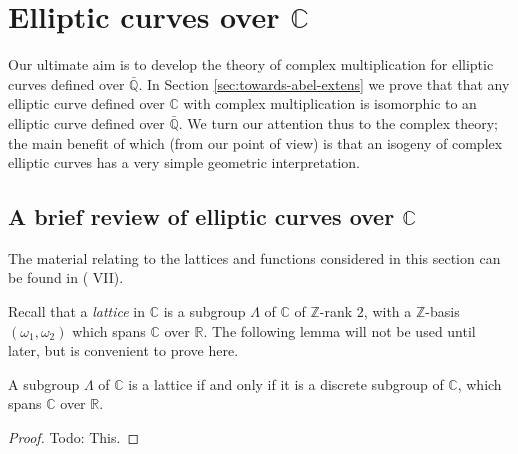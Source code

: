\newpage
\section{Elliptic curves over $\mathbb{C}$}
\label{sec:compl-mult-over-C}

Our ultimate aim is to develop the theory of complex multiplication for elliptic
curves defined over $\mathbb{\bar{Q}}$.  In Section \ref{sec:towards-abel-extens} we
prove that that any elliptic curve defined over $\mathbb{C}$ with complex
multiplication is isomorphic to an elliptic curve defined over $\mathbb{\bar{Q}}$.
We turn our attention thus to the complex theory; the main benefit of which (from our
point of view) is that an isogeny of complex elliptic curves has a very simple
geometric interpretation.

\subsection{A brief review of elliptic curves over $\mathbb{C}$}
\label{sec:review-complex-curves}



The material relating to the lattices and functions considered in this section can be
found in (\cite{serre73} VII).

Recall that a \emph{lattice} in $\mathbb{C}$ is a subgroup $\Lambda$ of $\mathbb{C}$ of
$\mathbb{Z}$-rank $2$, with a $\mathbb{Z}$-basis $(\omega_{1},\omega_{2})$ which
spans $\mathbb{C}$ over $\mathbb{R}$.  The following lemma will not be used until
later, but is convenient to prove here.

\begin{lem}
  \label{lem:latice-iff-discrete}
  A subgroup $\Lambda$ of $\mathbb{C}$ is a lattice if and only if it is a discrete
  subgroup of $\mathbb{C}$, which spans $\mathbb{C}$ over $\mathbb{R}$.
\end{lem}
\begin{proof}
  Todo: This.
\end{proof}

